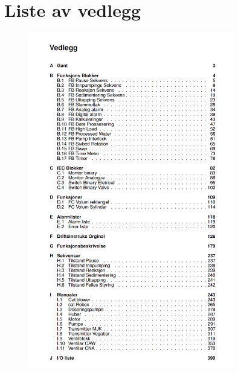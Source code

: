 
\chapter*{Liste av vedlegg}

\begin{figure}[H]
    \centering
    \includegraphics[width=0.8\textwidth]{Appendix/ListeAvVedlegg.png}
    \caption*{} %
    \label{fig:VedlegListe}
\end{figure}

